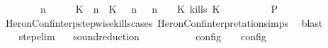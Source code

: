 \begin{isabellebody}
\ \ \ \ \ \ \ {\isacartoucheopen}{\isacharparenleft}{\isasymGamma}\ n\ {\isasymturnstile}\ {\isasymPsi}\ {\isasymtriangleright}\ {\isasymPhi}\ {\isacharequal}\ {\isacharparenleft}{\isacharparenleft}{\isacharparenleft}K\ {\isasymUp}\ n{\isacharparenright}\ {\isacharhash}\ {\isacharparenleft}K\ {\isasymnot}{\isasymUp}\ {\isasymge}\ n{\isacharparenright}\ {\isacharhash}\ {\isasymGamma}{\isacharparenright}{\isacharcomma}\ n\ {\isasymturnstile}\ {\isasymPsi}\ {\isasymtriangleright}\ {\isacharparenleft}{\isacharparenleft}K\ kills\ K\ {\isacharhash}\ {\isasymPhi}{\isacharparenright}{\isacharparenright}{\isacartoucheclose}\isanewline
\ \ \ \ \ \ \isamarkupfalse%
\ {\isacharquery}P\isanewline
\ \ \ \ \ \ \ \ \isamarkupfalse%
\ HeronConf{\isacharunderscore}interp{\isacharunderscore}stepwise{\isacharunderscore}kills{\isacharunderscore}cases\ HeronConf{\isacharunderscore}interpretation{\isachardot}simps\ \isamarkupfalse%
\ blast\isanewline
\ \ \ \ \isamarkupfalse%
\isanewline
\ \ \isamarkupfalse%
\isanewline
{}\isamarkupfalse%
%
\endisatagproof
{\isafoldproof}%
%
\isadelimproof
\isanewline
%
\endisadelimproof
\isanewline
{}\isamarkupfalse%
\ step{\isacharunderscore}elim{\isacharcolon}{\isacartoucheopen}{\isasymS}\ {\isasymhookrightarrow}\ {\isasymS}\isanewline
\isanewline
{}\isamarkupfalse%
\ sound{\isacharunderscore}reduction{\isacharprime}{\isacharcolon}\isanewline
\ \ \ {\isacartoucheopen}{\isasymS}\ {\isasymhookrightarrow}\ {\isasymS}\isanewline
\ \ \ {\isacartoucheopen}{\isasymlbrakk}\ {\isasymS}\ {\isasymrbrakk}\isactrlsub c\isactrlsub o\isactrlsub n\isactrlsub f\isactrlsub i\isactrlsub g\ {\isasymsupseteq}\ {\isasymlbrakk}\ {\isasymS}\ {\isasymrbrakk}\isactrlsub c\isactrlsub o\isactrlsub n\isactrlsub f\isactrlsub i\isactrlsub g{\isacartoucheclose}\isanewline
%
\isadelimproof
%
\endisadelimproof
%
\isatagproof
{}\isamarkupfalse%
\ {\isacharminus}\isanewline
\ \ \isamarkupfalse%

\end{isabellebody}

